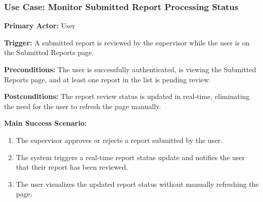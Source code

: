 \subsubsection{\textbf{Use Case: Monitor Submitted Report Processing Status}}

\textbf{Primary Actor:} User

\textbf{Trigger:} A submitted report is reviewed by the supervisor while the user is on the Submitted Reports page.

\textbf{Preconditions:} The user is successfully authenticated, is viewing the Submitted Reports page, and at least one report in the list is pending review.

\textbf{Postconditions:} The report review status is updated in real-time, eliminating the need for the user to refresh the page manually.

\vspace{0.5cm}

\textbf{Main Success Scenario:}

\begin{enumerate} [leftmargin=0.75cm, noitemsep]
\item The supervisor approves or rejects a report submitted by the user.
\item The system triggers a real-time report status update and notifies the user that their report has been reviewed.
\item The user visualizes the updated report status without manually refreshing the page.
\end{enumerate}

\vspace{0.3cm}

